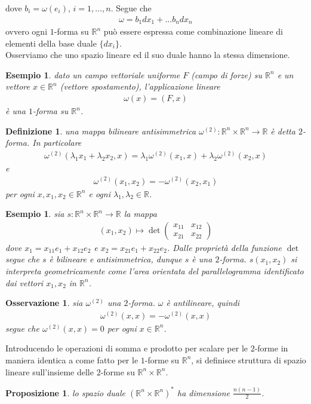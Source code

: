 \documentclass[twoside, 11pt]{amsbook}
\newcommand{\0}{{(0)}}
\newcommand{\3}{{(3)}}
\theoremstyle{colonplain}
\newtheorem{prop}[thm]{Proposizione}
\theoremstyle{colondefinition}
\newtheorem{defn}[thm]{Definizione}
\newtheorem{ex}[thm]{Esempio}
\theoremstyle{colonremark}
\newtheorem{rmk}[thm]{Osservazione}
\numberwithin{equation}{chapter}
\begin{document}
dove $b_i = \omega(e_i)$, $i = 1, \dots, n$. Segue che 
\begin{align}
    \omega = b_1dx_1 + \dots b_ndx_n 
\end{align}
ovvero ogni $1$-forma su $\mathbb{R}^n$ può essere espressa come combinazione lineare di elementi della base duale $\{dx_i\}$. \\
Osserviamo che uno spazio lineare ed il suo duale hanno la stessa dimensione.
\begin{ex} dato un campo vettoriale uniforme $F$ (campo di forze) su $\mathbb{R}^n$ e un vettore $x \in \mathbb{R}^n$ (vettore spostamento), l'applicazione lineare 
\begin{align}
    \omega(x) = (F, x) 
\end{align}
è una $1$-forma su $\mathbb{R}^n$.
\end{ex}
\begin{defn} una mappa bilineare antisimmetrica $\omega^{(2)} : \mathbb{R}^n \times \mathbb{R}^n \longrightarrow \mathbb{R}$ è detta $2$-\textit{forma}. In particolare 
\begin{align}
    \omega^{(2)}(\lambda_1x_1 + \lambda_2x_2, x) = \lambda_1\omega^{(2)}(x_1, x) + \lambda_2\omega^{(2)}(x_2, x) 
\end{align}
e
\begin{align}
    \omega^{(2)}(x_1, x_2) = -\omega^{(2)}(x_2, x_1)  
\end{align}
per ogni $x, x_1, x_2 \in \mathbb{R}^n$ e ogni $\lambda_1, \lambda_2 \in \mathbb{R}$.
\end{defn}
\begin{ex} sia $s : \mathbb{R}^n \times \mathbb{R}^n \longrightarrow \mathbb{R}$ la mappa 
\begin{align}
    (x_1, x_2) \mapsto \det
    \begin{pmatrix}
        x_{11} & x_{12} \\
        x_{21} & x_{22}
    \end{pmatrix} 
\end{align}
dove $x_1 = x_{11}e_1 + x_{12}e_2$ e $x_2 = x_{21}e_1 + x_{22}e_2$. Dalle proprietà della funzione $\det$ segue che $s$ è bilineare e antisimmetrica, dunque $s$ è una $2$-forma. $s(x_1, x_2)$ si interpreta geometricamente come l'area orientata del parallelogramma identificato dai vettori $x_1, x_2$ in $\mathbb{R}^n$.
\end{ex}
\begin{rmk} sia $\omega^{(2)}$ una $2$-forma. $\omega$ è antilineare, quindi
\begin{align}
    \omega^{(2)}(x, x) = -\omega^{(2)}(x, x)
\end{align}
segue che $\omega^{(2)}(x, x) = 0$ per ogni $x \in \mathbb{R}^n$.
\end{rmk}
Introducendo le operazioni di somma e prodotto per scalare per le $2$-forme in maniera identica a come fatto per le $1$-forme su $\mathbb{R}^n$, si definisce struttura di spazio lineare sull'insieme delle $2$-forme su $\mathbb{R}^n \times \mathbb{R}^n$.
\begin{prop}\label{R^n x R^n DualDim} lo spazio duale $(\mathbb{R}^n \times \mathbb{R}^n)^*$ ha dimensione $\frac{n(n - 1)}{2}$.
\end{prop}
\end{document}
